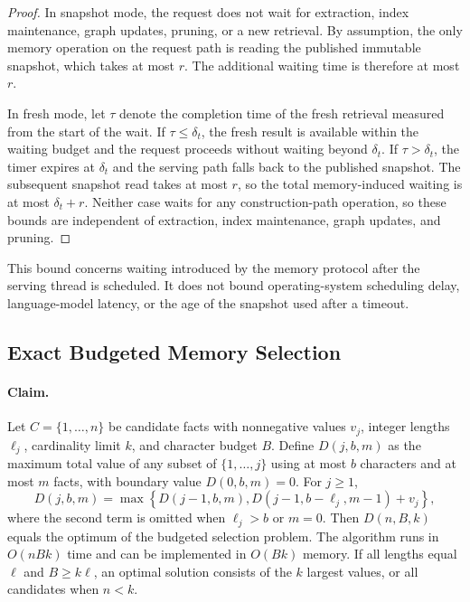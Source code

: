 \documentclass[letterpaper]{article} %
\begin{document}
\begin{proof}
In snapshot mode, the request does not wait for extraction, index maintenance, graph updates, pruning, or a new retrieval. By assumption, the only memory operation on the request path is reading the published immutable snapshot, which takes at most $r$. The additional waiting time is therefore at most $r$.

In fresh mode, let $\tau$ denote the completion time of the fresh retrieval measured from the start of the wait. If $\tau\le\delta_t$, the fresh result is available within the waiting budget and the request proceeds without waiting beyond $\delta_t$. If $\tau>\delta_t$, the timer expires at $\delta_t$ and the serving path falls back to the published snapshot. The subsequent snapshot read takes at most $r$, so the total memory-induced waiting is at most $\delta_t+r$. Neither case waits for any construction-path operation, so these bounds are independent of extraction, index maintenance, graph updates, and pruning.
\end{proof}

This bound concerns waiting introduced by the memory protocol after the serving thread is scheduled. It does not bound operating-system scheduling delay, language-model latency, or the age of the snapshot used after a timeout.

\subsection{Exact Budgeted Memory Selection}

\paragraph{Claim.} Let $C=\{1,\ldots,n\}$ be candidate facts with nonnegative values $v_j$, integer lengths $\ell_j$, cardinality limit $k$, and character budget $B$. Define $D(j,b,m)$ as the maximum total value of any subset of $\{1,\ldots,j\}$ using at most $b$ characters and at most $m$ facts, with boundary value $D(0,b,m)=0$. For $j\ge1$,
\begin{equation}
D(j,b,m)=\max\left\{D(j-1,b,m),D(j-1,b-\ell_j,m-1)+v_j\right\},
\end{equation}
where the second term is omitted when $\ell_j>b$ or $m=0$. Then $D(n,B,k)$ equals the optimum of the budgeted selection problem. The algorithm runs in $O(nBk)$ time and can be implemented in $O(Bk)$ memory. If all lengths equal $\ell$ and $B\ge k\ell$, an optimal solution consists of the $k$ largest values, or all candidates when $n<k$.
\end{document}
